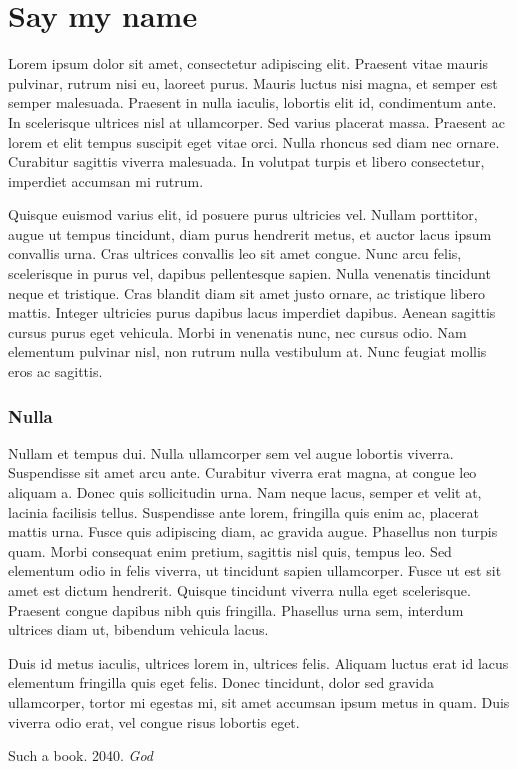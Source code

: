 \documentclass[a4paper,12pt]{article}
\begin{document}
\newpage
\section{Say my name}

Lorem ipsum dolor sit amet, consectetur adipiscing elit. Praesent vitae mauris pulvinar, rutrum nisi eu, laoreet purus. Mauris luctus nisi magna, et semper est semper malesuada. Praesent in nulla iaculis, lobortis elit id, condimentum ante. In scelerisque ultrices nisl at ullamcorper. Sed varius placerat massa. Praesent ac lorem et elit tempus suscipit eget vitae orci. Nulla rhoncus sed diam nec ornare. Curabitur sagittis viverra malesuada. In volutpat turpis et libero consectetur, imperdiet accumsan mi rutrum.

Quisque euismod varius elit, id posuere purus ultricies vel. Nullam porttitor, augue ut tempus tincidunt, diam purus hendrerit metus, et auctor lacus ipsum convallis urna. Cras ultrices convallis leo sit amet congue. Nunc arcu felis, scelerisque in purus vel, dapibus pellentesque sapien. Nulla venenatis tincidunt neque et tristique. Cras blandit diam sit amet justo ornare, ac tristique libero mattis. Integer ultricies purus dapibus lacus imperdiet dapibus. Aenean sagittis cursus purus eget vehicula. Morbi in venenatis nunc, nec cursus odio. Nam elementum pulvinar nisl, non rutrum nulla vestibulum at. Nunc feugiat mollis eros ac sagittis.

\subsubsection*{Nulla}
Nullam et tempus dui. Nulla ullamcorper sem vel augue lobortis viverra. Suspendisse sit amet arcu ante. Curabitur viverra erat magna, at congue leo aliquam a. Donec quis sollicitudin urna. Nam neque lacus, semper et velit at, lacinia facilisis tellus. Suspendisse ante lorem, fringilla quis enim ac, placerat mattis urna. Fusce quis adipiscing diam, ac gravida augue. Phasellus non turpis quam. Morbi consequat enim pretium, sagittis nisl quis, tempus leo. Sed elementum odio in felis viverra, ut tincidunt sapien ullamcorper. Fusce ut est sit amet est dictum hendrerit. Quisque tincidunt viverra nulla eget scelerisque. Praesent congue dapibus nibh quis fringilla. Phasellus urna sem, interdum ultrices diam ut, bibendum vehicula lacus.

Duis id metus iaculis, ultrices lorem in, ultrices felis. Aliquam luctus erat id lacus elementum fringilla quis eget felis. Donec tincidunt, dolor sed gravida ullamcorper, tortor mi egestas mi, sit amet accumsan ipsum metus in quam. Duis viverra odio erat, vel congue risus lobortis eget. 




\newpage
\begin{thebibliography}{99}

 Such a book. 2040. \emph{God}

\end{thebibliography}
\end{document}
